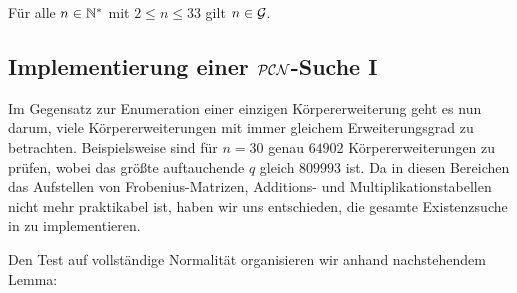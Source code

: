 \begin{satz}
  \label{satz:hauptsatz_g}
  Für alle $n\in \mathbb{N}^\ast$ mit $2 \leq n \leq 33$ gilt
  $n \in \mathcal{G}$.
\end{satz}


\subsection{Implementierung einer $\mathcal{PCN}$-Suche I}

Im Gegensatz zur Enumeration einer einzigen Körpererweiterung geht es nun
darum, viele Körpererweiterungen mit immer gleichem Erweiterungsgrad zu
betrachten. Beispielsweise sind für $n = 30$ genau
$64902$ Körpererweiterungen zu prüfen, wobei das größte auftauchende $q$
gleich $809993$ ist.
Da in diesen Bereichen das Aufstellen von Frobenius-Matrizen, Additions- und
Multiplikationstabellen nicht mehr praktikabel ist, haben wir uns entschieden,
die gesamte Existenzsuche in \sage zu implementieren.


Den Test auf vollständige Normalität organisieren wir anhand nachstehendem
Lemma: 

